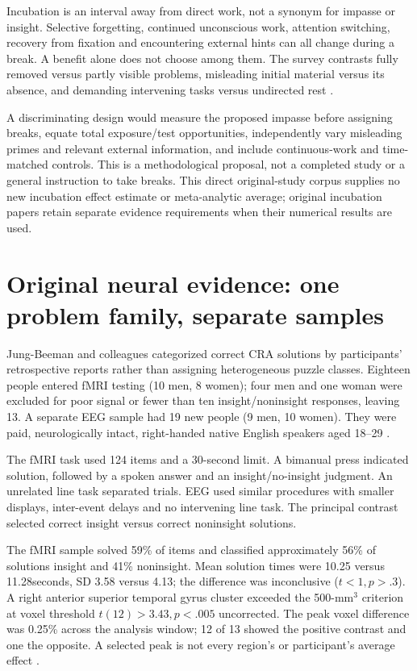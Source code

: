 Incubation is an interval away from direct work, not a synonym for impasse
or insight. Selective forgetting, continued unconscious work, attention
switching, recovery from fixation and encountering external hints can all
change during a break. A benefit alone does not choose among them.
The survey contrasts fully removed versus partly visible problems, misleading
initial material versus its absence, and demanding intervening tasks versus
undirected rest \parencite[pp.~483--484]{VanSteenburghEtAl2012InsightRevises}.

A discriminating design would measure the proposed impasse before assigning
breaks, equate total exposure/test opportunities, independently vary
misleading primes and relevant external information, and include continuous-work
and time-matched controls. This is a methodological proposal, not a completed
study or a general instruction to take breaks.
This direct original-study corpus supplies no new incubation effect estimate
or meta-analytic average; original incubation papers retain separate
evidence requirements when their numerical results are used.

\section{Original neural evidence: one problem family, separate samples}
\label{sec:p19-insight-neural-evidence}

Jung-Beeman and colleagues categorized correct CRA solutions by participants'
retrospective reports rather than assigning heterogeneous puzzle classes.
Eighteen people entered fMRI testing (10 men, 8 women); four men and one
woman were excluded for poor signal or fewer than ten insight/noninsight
responses, leaving 13. A separate EEG sample had 19 new people (9 men, 10 women).
They were paid, neurologically intact, right-handed native English speakers
aged 18--29 \parencite[pp.~507--508]{JungBeemanEtAl2004NeuralInsight}.

The fMRI task used 124 items and a 30-second limit. A bimanual press indicated
solution, followed by a spoken answer and an insight/no-insight judgment.
An unrelated line task separated trials. EEG used similar procedures with
smaller displays, inter-event delays and no intervening line task.
The principal contrast selected correct insight versus correct noninsight
solutions.

The fMRI sample solved 59\% of items and classified approximately 56\% of
solutions insight and 41\% noninsight.
Mean solution times were 10.25 versus 11.28seconds, SD 3.58 versus 4.13;
the difference was inconclusive (\(t<1,p>.3\)).
A right anterior superior temporal gyrus cluster exceeded the 500-\(\mathrm{mm}^3\)
criterion at voxel threshold \(t(12)>3.43,p<.005\) uncorrected.
The peak voxel difference was 0.25\% across the analysis window;
12 of 13 showed the positive contrast and one the opposite.
A selected peak is not every region's or participant's average effect
\parencite[pp.~501--503,508]{JungBeemanEtAl2004NeuralInsight}.

